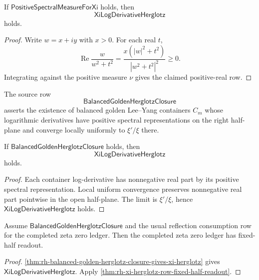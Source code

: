 \begin{theorem}
\label{thm:rh-positive-spectral-measure-gives-xi-herglotz}
If $\mathsf{PositiveSpectralMeasureForXi}$ holds, then
$$
\mathsf{XiLogDerivativeHerglotz}
$$
holds.
\end{theorem}

\begin{proof}
Write $w=x+iy$ with $x>0$.  For each real $t$,
$$
\operatorname{Re}
\frac{w}{w^2+t^2}
=
\frac{x(|w|^2+t^2)}{|w^2+t^2|^2}
\ge0.
$$
Integrating against the positive measure $\nu$ gives the claimed
positive-real row.
\end{proof}

\begin{definition}
\label{def:rh-balanced-golden-herglotz-closure}
The source row
$$
\mathsf{BalancedGoldenHerglotzClosure}
$$
asserts the existence of balanced golden Lee--Yang containers $C_m$
whose logarithmic derivatives have positive spectral representations on
the right half-plane and converge locally uniformly to $\xi'/\xi$ there.
\end{definition}

\begin{theorem}
\label{thm:rh-balanced-golden-herglotz-closure-gives-xi-herglotz}
If $\mathsf{BalancedGoldenHerglotzClosure}$ holds, then
$$
\mathsf{XiLogDerivativeHerglotz}
$$
holds.
\end{theorem}

\begin{proof}
Each container log-derivative has nonnegative real part by its positive
spectral representation.  Local uniform convergence preserves
nonnegative real part pointwise in the open half-plane.  The limit is
$\xi'/\xi$, hence $\mathsf{XiLogDerivativeHerglotz}$ holds.
\end{proof}

\begin{corollary}
\label{cor:rh-balanced-golden-herglotz-closure-fixed-half-readout}
Assume $\mathsf{BalancedGoldenHerglotzClosure}$ and the usual reflection
consumption row for the completed zeta zero ledger.  Then the completed
zeta zero ledger has fixed-half readout.
\end{corollary}

\begin{proof}
\autoref{thm:rh-balanced-golden-herglotz-closure-gives-xi-herglotz}
gives $\mathsf{XiLogDerivativeHerglotz}$.  Apply
\autoref{thm:rh-xi-herglotz-row-fixed-half-readout}.
\end{proof}

